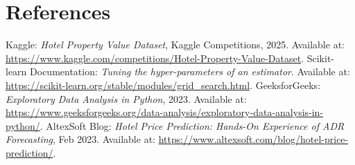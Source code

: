 \documentclass[12pt]{article}
\begin{document}
\section{References}
\begin{thebibliography}{9}
 Kaggle: \textit{Hotel Property Value Dataset}, Kaggle Competitions, 2025. Available at: \url{https://www.kaggle.com/competitions/Hotel-Property-Value-Dataset}.
 Scikit-learn Documentation: \textit{Tuning the hyper-parameters of an estimator}. Available at: \url{https://scikit-learn.org/stable/modules/grid_search.html}.
 GeeksforGeeks: \textit{Exploratory Data Analysis in Python}, 2023. Available at: \url{https://www.geeksforgeeks.org/data-analysis/exploratory-data-analysis-in-python/}.
 AltexSoft Blog: \textit{Hotel Price Prediction: Hands-On Experience of ADR Forecasting}, Feb 2023. Available at: \url{https://www.altexsoft.com/blog/hotel-price-prediction/}.
\end{thebibliography}
\end{document}
